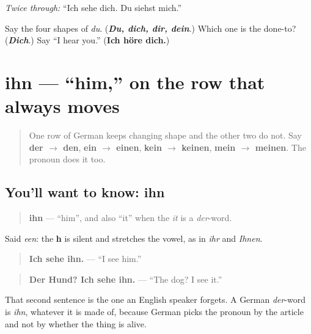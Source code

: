 \emph{Twice through:} \textquotedblleft{}Ich sehe dich. Du siehst mich.\textquotedblright{}

\begin{tcolorbox}[breakable,colback=teal!4,colframe=teal!35!black,title={Before you move on}]
Say the four shapes of \emph{du}. (\emph{\textbf{Du, dich, dir, dein}}.) Which one is the done-to? (\emph{\textbf{Dich}}.) Say \textquotedblleft{}I hear you.\textquotedblright{} (\textbf{Ich höre dich.})
\end{tcolorbox}
\section[ihn]{ihn — \textquotedblleft{}him,\textquotedblright{} on the row that always moves}

\label{lesson:GE-C37-ihn}



\begin{quote}
One row of German keeps changing shape and the other two do not. Say \textbf{der $\to$ den}, \textbf{ein $\to$ einen}, \textbf{kein $\to$ keinen}, \textbf{mein $\to$ meinen}. The pronoun does it too.
\end{quote}

\subsection*{You'll want to know: ihn}
\begin{quote}
\textbf{ihn} — \textquotedblleft{}him\textquotedblright{}, and also \textquotedblleft{}it\textquotedblright{} when the \emph{it} is a \emph{der}-word.
\end{quote}

Said \emph{een}: the \textbf{h} is silent and stretches the vowel, as in \emph{ihr} and \emph{Ihnen}.

\begin{quote}
\textbf{Ich sehe ihn.} — \textquotedblleft{}I see him.\textquotedblright{}
\end{quote}

\begin{quote}
\textbf{Der Hund? Ich sehe ihn.} — \textquotedblleft{}The dog? I see it.\textquotedblright{}
\end{quote}

That second sentence is the one an English speaker forgets. A German \emph{der}-word is \emph{ihn}, whatever it is made of, because German picks the pronoun by the article and not by whether the thing is alive.


